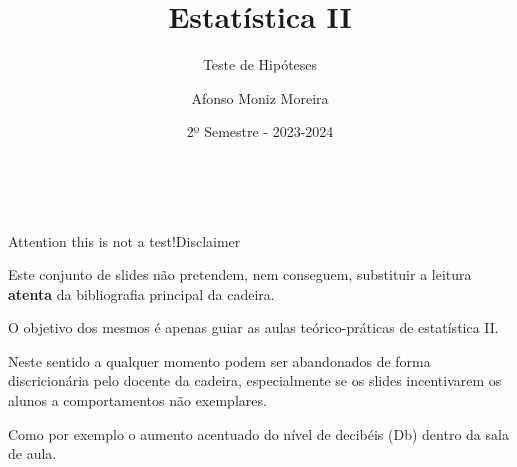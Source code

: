 \documentclass[10,5pt, pdf]{beamer}
\title{Estatística II}
\subtitle{Teste de Hipóteses}
\institute{Departamento de Métodos Quantitativos para a Economia e Gestão (DMQEG)}
\author{Afonso Moniz Moreira}
\date{2º Semestre - 2023-2024}
\begin{document}


{
\begin{frame}[plain]
\vspace{0.5cm}
\textbf{}\\
\footnotesize{}
\vspace{1cm}
\titlepage
\end{frame}
}


\begin{frame}{Attention this is not a test!}{Disclaimer}
\begin{center}
Este conjunto de slides não pretendem, nem conseguem, substituir a leitura \textbf{atenta} da bibliografia principal da cadeira.\par
\pause
O objetivo dos mesmos é apenas guiar as aulas teórico-práticas de estatística II.\par
\pause
Neste sentido a qualquer momento podem ser abandonados de forma discricionária pelo docente da cadeira, especialmente se os slides incentivarem os alunos a comportamentos não exemplares.\par
\pause
Como  por exemplo o aumento acentuado do nível de decibéis (Db) dentro da sala de aula. 
\end{center}
\end{frame}
\end{document}
